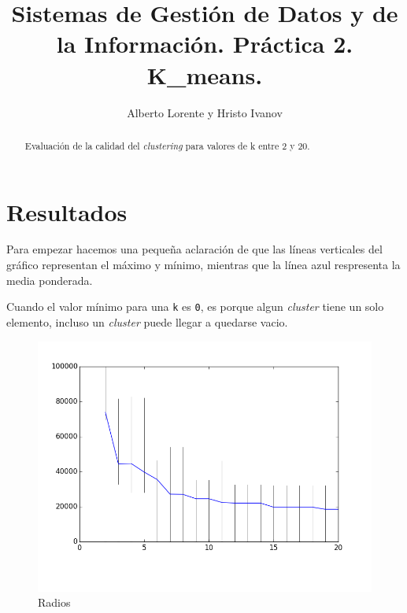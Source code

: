 \documentclass{article}
\begin{document}
\title{Sistemas de Gestión de Datos y de la Información. Práctica 2. \\ K\_means.}
\author{Alberto Lorente y Hristo Ivanov}
\maketitle

  \begin{abstract}
     Evaluación de la calidad del \emph{clustering} para valores de k entre 2 y 20.
  \end{abstract}

  \section{Resultados}
    Para empezar hacemos una pequeña aclaración de que las líneas verticales del gráfico
    representan el máximo y mínimo, mientras que la línea azul respresenta la media ponderada.
    \par
    Cuando el valor mínimo para una \texttt{k} es \texttt{0}, es porque algun \emph{cluster}
    tiene un solo elemento, incluso un \emph{cluster} puede llegar a quedarse vacio.    

    \begin{figure}[h]
      \centering
      \includegraphics[height=0.4\textheight, width=1\textwidth]{../imgs/Radios.png}
      \caption{Radios}
      \label{fig:radios}
    \end{figure}
\end{document}

